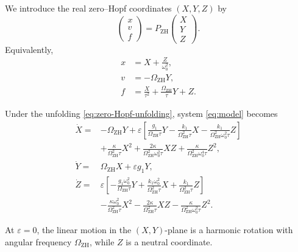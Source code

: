 \documentclass[11pt,reqno]{amsart}
\theoremstyle{plain}
\theoremstyle{definition}
\theoremstyle{remark}
\begin{document}
We introduce the real zero--Hopf coordinates \((X,Y,Z)\) by
\begin{equation}
\label{eq:zero-Hopf-coordinate-transformation}
\begin{pmatrix}
x\\v\\f
\end{pmatrix}
=
P_{\mathrm{ZH}}
\begin{pmatrix}
X\\Y\\Z
\end{pmatrix}.
\end{equation}
Equivalently,
\begin{equation}
\label{eq:zero-Hopf-coordinate-transformation-explicit}
\begin{aligned}
x
&=
X+\frac{Z}{\omega_0^2},
\\[2mm]
v
&=
-\Omega_{\mathrm{ZH}}Y,
\\[2mm]
f
&=
\frac{X}{\tau^2}
+
\frac{\Omega_{\mathrm{ZH}}}{\tau}Y
+
Z.
\end{aligned}
\end{equation}

Under the unfolding \eqref{eq:zero-Hopf-unfolding}, system
\eqref{eq:model} becomes
\begin{equation}
\label{eq:zero-Hopf-XYZ-system}
\begin{aligned}
\dot X
={}&
-\Omega_{\mathrm{ZH}}Y
+
\varepsilon
\left[
\frac{g_1}{\Omega_{\mathrm{ZH}}\tau}Y
-
\frac{k_1}{\Omega_{\mathrm{ZH}}^2\tau}X
-
\frac{k_1}
{\Omega_{\mathrm{ZH}}^2\omega_0^2\tau}Z
\right]
\\
&+
\frac{\kappa}
{\Omega_{\mathrm{ZH}}^2\tau}X^2
+
\frac{2\kappa}
{\Omega_{\mathrm{ZH}}^2\omega_0^2\tau}XZ
+
\frac{\kappa}
{\Omega_{\mathrm{ZH}}^2\omega_0^4\tau}Z^2,
\\[2mm]
\dot Y
={}&
\Omega_{\mathrm{ZH}}X
+
\varepsilon g_1Y,
\\[2mm]
\dot Z
={}&
\varepsilon
\left[
-\frac{
g_1\omega_0^2
}{
\Omega_{\mathrm{ZH}}\tau
}Y
+
\frac{
k_1\omega_0^2
}{
\Omega_{\mathrm{ZH}}^2\tau
}X
+
\frac{k_1}
{\Omega_{\mathrm{ZH}}^2\tau}Z
\right]
\\
&-
\frac{
\kappa\omega_0^2
}{
\Omega_{\mathrm{ZH}}^2\tau
}X^2
-
\frac{
2\kappa
}{
\Omega_{\mathrm{ZH}}^2\tau
}XZ
-
\frac{
\kappa
}{
\Omega_{\mathrm{ZH}}^2\omega_0^2\tau
}Z^2.
\end{aligned}
\end{equation}

At \(\varepsilon=0\), the linear motion in the \((X,Y)\)-plane is a
harmonic rotation with angular frequency \(\Omega_{\mathrm{ZH}}\), while
\(Z\) is a neutral coordinate.
\end{document}
